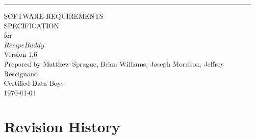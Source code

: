 \documentclass{scrreprt}
\def\myversion{1.6}
\begin{document}
\begin{flushright}
    \rule{16cm}{5pt}\vskip1cm
    \begin{bfseries}
        \Huge{SOFTWARE REQUIREMENTS\\ SPECIFICATION}\\
        \vspace{1.85cm}
        for\\
        \vspace{1.85cm}
        $Recipe Buddy$\\
        \vspace{1.8cm}
        \LARGE{Version \myversion}\\
        \vspace{1.8cm}
        Prepared by $ $Matthew Sprague, Brian Williams, Joseph Morrison, Jeffrey Rescignano$ $\\
        \vspace{1.8cm}
        $ $Certified Data Boys$ $\\
        \vspace{1.8cm}
        \today\\
    \end{bfseries}
\end{flushright}

\tableofcontents

\chapter*{Revision History}\label{revisions}
\end{document}
